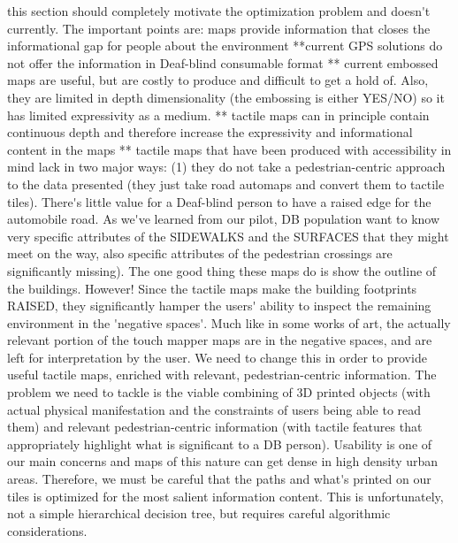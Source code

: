 \ac{this section should completely motivate the optimization problem and doesn't currently.
The important points are:
maps provide information that closes the informational gap for people about the environment
**current GPS solutions do not offer the information in Deaf-blind consumable format
** current embossed maps are useful, but are costly to produce and difficult to get a hold of. Also, they are limited in depth dimensionality (the embossing is either YES/NO) so it has limited expressivity as a medium.
** tactile maps can in principle contain continuous depth and therefore increase the expressivity and informational content in the maps
** tactile maps that have been produced with accessibility in mind lack in two major ways: (1) they do not take a pedestrian-centric approach to the data presented (they just take road automaps and convert them to tactile tiles). There's little value for a Deaf-blind person to have a raised edge for the automobile road. As we've learned from our pilot, DB population want to know very specific attributes of the SIDEWALKS and the SURFACES that they might meet on the way, also specific attributes of the pedestrian crossings are significantly missing). The one good thing these maps do is show the outline of the buildings. However! Since the tactile maps make the building footprints RAISED, they significantly hamper the users' ability to inspect the remaining environment in the 'negative spaces'. Much like in some works of art, the actually relevant portion of the touch mapper maps are in the negative spaces, and are left for interpretation by the user. We need to change this in order to provide useful tactile maps, enriched with relevant, pedestrian-centric information.
The problem we need to tackle is the viable combining of 
3D printed objects (with actual physical manifestation and the constraints of users being able to read them)
and 
relevant pedestrian-centric information (with tactile features that appropriately highlight what is significant to a DB person).

Usability is one of our main concerns and maps of this nature can get dense in high density urban areas. Therefore, we must be careful that the paths and what's printed on our tiles is optimized for the most salient information content. This is unfortunately, not a simple hierarchical decision tree, but requires careful algorithmic considerations.

}



